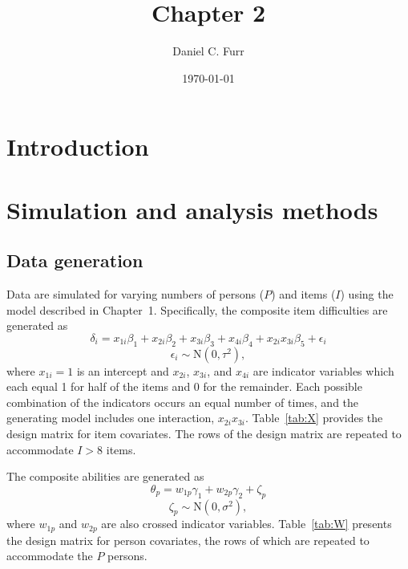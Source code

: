 \documentclass[12pt, letterpaper]{article}
\title{Chapter 2}
\author{Daniel C. Furr}
\date{\today}
\begin{document}

\newcommand{\comment}[1]{{\footnotesize[\textit{#1}]}}

\maketitle

\tableofcontents
\newpage
{\footnotesize }


\section{Introduction}


\section{Simulation and analysis methods}

\subsection{Data generation}

Data are simulated for varying numbers of persons ($P$) and items ($I$) using the model described in Chapter~1. Specifically, the composite item difficulties are generated as
\begin{equation}
	\delta_i = x_{1i}\beta_1 + x_{2i}\beta_2 + x_{3i}\beta_3 + x_{4i}\beta_4 + 
		x_{2i}x_{3i}\beta_5 + \epsilon_i
\end{equation}
\begin{equation}
	\epsilon_i \sim \mathrm{N}(0, \tau^2)
,\end{equation}
where $x_{1i} = 1$ is an intercept and $x_{2i}$, $x_{3i}$, and $x_{4i}$ are indicator variables which each equal 1 for half of the items and 0 for the remainder. Each possible combination of the indicators occurs an equal number of times, and the generating model includes one interaction, $x_{2i}x_{3i}$. Table~\ref{tab:X} provides the design matrix for item covariates. The rows of the design matrix are repeated to accommodate $I > 8$ items.



The composite abilities are generated as
\begin{equation} \label{eq:theta}
	\theta_p = w_{1p}\gamma_1 + w_{2p}\gamma_2  + \zeta_p
\end{equation}
\begin{equation} \label{eq:zeta}
	\zeta_p \sim \mathrm{N}(0, \sigma^2)
,\end{equation}
where $w_{1p}$ and $w_{2p}$ are also crossed indicator variables. Table~\ref{tab:W} presents the design matrix for person covariates, the rows of which are repeated to accommodate the $P$ persons.
\end{document}
